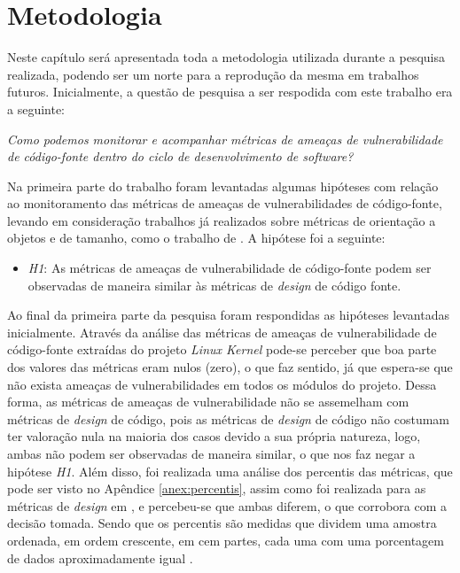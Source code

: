 \chapter{Metodologia}\label{metodologia}

Neste capítulo será apresentada toda a metodologia utilizada durante a
pesquisa realizada, podendo ser um norte para a reprodução da mesma em trabalhos
futuros. Inicialmente, a questão de pesquisa a ser respodida com este trabalho era a
seguinte:

\begin{center}
  \textit{Como podemos monitorar e acompanhar métricas de ameaças de
    vulnerabilidade de código-fonte dentro do ciclo de desenvolvimento de
    software?
}
\end{center}

Na primeira parte do trabalho foram levantadas algumas hipóteses com relação ao
monitoramento das métricas de ameaças de vulnerabilidades de código-fonte,
levando em consideração trabalhos já realizados sobre métricas de orientação a
objetos e de tamanho, como o trabalho de . A hipótese
foi a seguinte:

\begin{itemize}
  \item \textit{H1}: As métricas de ameaças de vulnerabilidade de código-fonte
  podem ser observadas de maneira similar às métricas de \textit{design} de código
  fonte.
\end{itemize}

Ao final da primeira parte da pesquisa foram respondidas as hipóteses levantadas
inicialmente. Através da análise das métricas de ameaças de vulnerabilidade de
código-fonte extraídas do projeto \textit{Linux Kernel} pode-se perceber que boa
parte dos valores das métricas eram nulos (zero), o que faz sentido, já que
espera-se que não exista ameaças de vulnerabilidades em todos os módulos do
projeto. Dessa forma, as métricas de ameaças de vulnerabilidade não se
assemelham com métricas de \textit{design} de código, pois as métricas de
\textit{design} de código não costumam ter valoração nula na maioria dos casos
devido a sua própria natureza, logo, ambas não podem ser observadas de maneira
similar, o que nos faz negar a hipótese \textit{H1}. Além disso, foi
realizada uma análise dos percentis das métricas, que pode ser visto no Apêndice
\ref{anex:percentis}, assim como foi realizada para as métricas de
\textit{design} em , e percebeu-se que ambas diferem,
o que corrobora com a decisão tomada. Sendo que os percentis são medidas que
dividem uma amostra ordenada, em ordem crescente, em cem partes, cada uma com
uma porcentagem de dados aproximadamente igual \cite{martins2013}.

